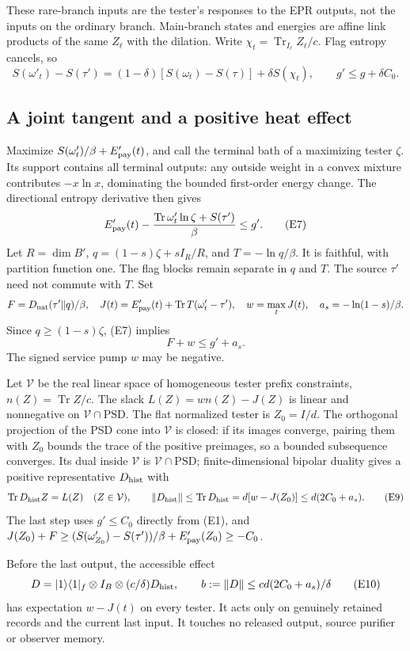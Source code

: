 \documentclass[11pt]{article}
\theoremstyle{definition}
\theoremstyle{remark}
\newcommand{\Tr}{\operatorname{Tr}}
\providecommand{\D}{D_{\mathrm{nat}}}
\begin{document}
These rare-branch inputs are the tester's responses to the EPR outputs,
not the inputs on the ordinary branch. Main-branch states and energies
are affine link products of the same \(Z_\ell\) with the dilation.
Write \(\chi_t=\Tr_{I_\ell}Z_\ell/c\). Flag entropy cancels, so
\[
 S(\omega'_t)-S(\tau')
 =(1-\delta)[S(\omega_t)-S(\tau)]+\delta S(\chi_t),\qquad
 g'\le g+\delta C_0.                                \tag{E6}
\]

\subsection{A joint tangent and a positive heat effect}
Maximize \(S(\omega'_t)/\beta+E_{\rm pay}'(t)\), and call the terminal
bath of a maximizing tester \(\zeta\). Its support contains all terminal
outputs: any outside weight in a convex mixture contributes
\(-x\ln x\), dominating the bounded first-order energy change.
The directional entropy derivative then gives
\[
 E_{\rm pay}'(t)-\frac{\Tr\omega'_t\ln\zeta+S(\tau')}{\beta}
 \le g'.                                           \tag{E7}
\]
Let \(R=\dim B'\), \(q=(1-s)\zeta+sI_R/R\), and
\(T=-\ln q/\beta\). It is faithful, with partition function one.
The flag blocks remain separate in \(q\) and \(T\).
The source \(\tau'\) need not commute with \(T\).
Set
\[
 F=\D(\tau'\|q)/\beta,\quad
 J(t)=E_{\rm pay}'(t)+\Tr T(\omega'_t-\tau'),\quad
 w=\max_tJ(t),\quad a_s=-\ln(1-s)/\beta.
\]
Since \(q\ge(1-s)\zeta\), (E7) implies
\[
 F+w\le g'+a_s.                                    \tag{E8}
\]
The signed service pump \(w\) may be negative.

Let \(\mathcal V\) be the real linear space of homogeneous tester
prefix constraints, \(n(Z)=\Tr Z/c\). The slack
\(L(Z)=w n(Z)-J(Z)\) is linear and nonnegative on
\(\mathcal V\cap\mathrm{PSD}\). The flat normalized tester is
\(Z_0=I/d\). The orthogonal projection of the PSD cone into
\(\mathcal V\) is closed: if its images converge, pairing them with
\(Z_0\) bounds the trace of the positive preimages, so a bounded
subsequence converges. Its dual inside \(\mathcal V\) is
\(\mathcal V\cap\mathrm{PSD}\); finite-dimensional bipolar duality gives
a positive representative \(D_{\rm hist}\) with
\[
 \Tr D_{\rm hist}Z=L(Z)\quad(Z\in\mathcal V),\qquad
 \|D_{\rm hist}\|\le\Tr D_{\rm hist}
 =d[w-J(Z_0)]\le d(2C_0+a_s).                       \tag{E9}
\]
The last step uses \(g'\le C_0\) directly from (E1), and
\(J(Z_0)+F\ge(S(\omega'_{Z_0})-S(\tau'))/\beta+E'_{\rm pay}(Z_0)
\ge-C_0\).

Before the last output, the accessible effect
\[
 D=|1\rangle\langle1|_f\otimes I_B\otimes
       (c/\delta)D_{\rm hist},\qquad
 b:=\|D\|\le cd(2C_0+a_s)/\delta                     \tag{E10}
\]
has expectation \(w-J(t)\) on every tester. It acts only on genuinely
retained records and the current last input. It touches no released
output, source purifier or observer memory.
\end{document}
